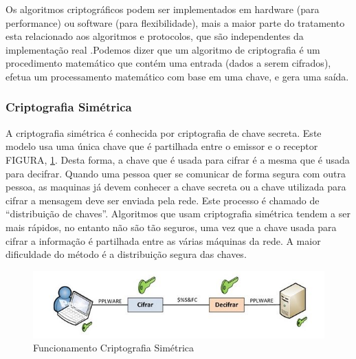 \documentclass[12pt]{article}
\begin{document}
Os algoritmos criptográficos podem ser implementados em hardware (para performance) ou software (para flexibilidade), mais a maior parte do tratamento esta relacionado aos algoritmos e protocolos, que são independentes da implementação real \cite{TANENBAUM:03}.Podemos dizer que um algoritmo de criptografia é um procedimento matemático que contém uma entrada (dados a serem cifrados), efetua um processamento matemático com base em uma chave, e gera uma saída.

\subsubsection{Criptografia Simétrica}


A criptografia simétrica é conhecida por criptografia de chave secreta. Este modelo usa uma única chave que é partilhada entre o emissor e o receptor FIGURA, \ref{cripto1}. Desta forma, a chave que é usada para cifrar é a mesma que é usada para decifrar. Quando  uma pessoa  quer  se  comunicar  de  forma  segura  com  outra  pessoa, as maquinas já devem conhecer a chave secreta ou a chave utilizada para cifrar a mensagem deve ser enviada pela rede. Este processo é chamado de “distribuição de chaves”. Algoritmos que usam criptografia simétrica tendem a ser mais rápidos, no entanto não são tão seguros, uma vez que a chave usada para cifrar a informação é partilhada entre as várias máquinas da rede. A maior dificuldade do método é a distribuição segura das chaves\cite{BURNETT:02}.

 \begin{figure}[h!]
	\centering
	\includegraphics[]{Simetrica.JPG}
	\caption{Funcionamento Criptografia Simétrica}
	\label{cripto1}
\end{figure}
\end{document}
